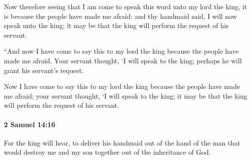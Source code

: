 			\begin{versebox}
					\item[BHS] 
					\item[ASV] Now therefore seeing that I am come to speak this word unto my lord the king, it is because the people have made me afraid: and thy handmaid said, I will now speak unto the king; it may be that the king will perform the request of his servant.
					\item[NIV] “And now I have come to say this to my lord the king because the people have made me afraid. Your servant thought, ‘I will speak to the king; perhaps he will grant his servant’s request.
					\item[NRSV] Now I have come to say this to my lord the king because the people have made me afraid; your servant thought, ‘I will speak to the king; it may be that the king will perform the request of his servant.
			\end{versebox}

		\paragraph{2 Samuel 14:16} %
			\label{2SAMUEL-14-16}

			For the king will hear, to deliver his handmaid out of the hand of the man that would destroy me and my son together out of the inheritance of God.

